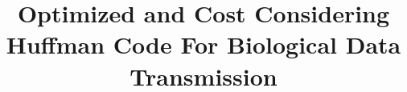 \documentclass[preprint,12pt]{elsarticle}
\begin{document}
\begin{frontmatter}



\title{Optimized and Cost Considering Huffman Code For Biological Data Transmission}


\author{}

\address{}

\begin{abstract}

\end{abstract}

\begin{keyword}



\end{keyword}

\end{frontmatter}


\end{document}
